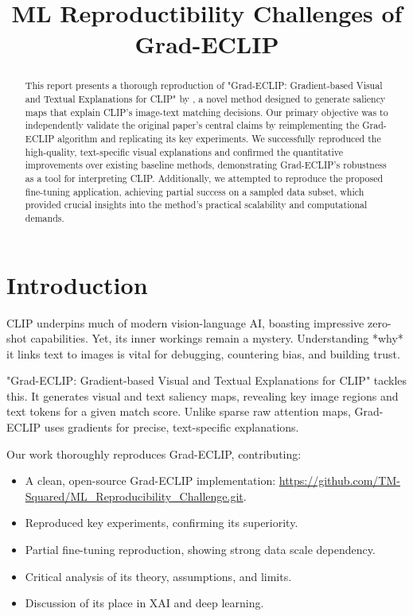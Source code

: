\documentclass[10pt]{article} %
\title{ML Reproductibility Challenges of  Grad-ECLIP}
\begin{document}
\maketitle

\begin{abstract}This report presents a thorough reproduction of "Grad-ECLIP: Gradient-based Visual and Textual Explanations for CLIP" by \citet{zhao2024grad}, a novel method designed to generate saliency maps that explain CLIP's image-text matching decisions. Our primary objective was to independently validate the original paper's central claims by reimplementing the Grad-ECLIP algorithm and replicating its key experiments. We successfully reproduced the high-quality, text-specific visual explanations and confirmed the quantitative improvements over existing baseline methods, demonstrating Grad-ECLIP's robustness as a tool for interpreting CLIP. Additionally, we attempted to reproduce the proposed fine-tuning application, achieving partial success on a sampled data subset, which provided crucial insights into the method's practical scalability and computational demands. 
\end{abstract}
\section{Introduction}

CLIP \citep{radford2021learning} underpins much of modern vision-language AI, boasting impressive zero-shot capabilities. Yet, its inner workings remain a mystery. Understanding *why* it links text to images is vital for debugging, countering bias, and building trust.

"Grad-ECLIP: Gradient-based Visual and Textual Explanations for CLIP" \citep{zhao2024grad} tackles this. It generates visual and text saliency maps, revealing key image regions and text tokens for a given match score. Unlike sparse raw attention maps, Grad-ECLIP uses gradients for precise, text-specific explanations.

Our work thoroughly reproduces Grad-ECLIP, contributing:
\begin{itemize}
    \item A clean, open-source Grad-ECLIP implementation: \url{https://github.com/TM-Squared/ML_Reproducibility_Challenge.git}.
    \item Reproduced key experiments, confirming its superiority.
    \item Partial fine-tuning reproduction, showing strong data scale dependency.
    \item Critical analysis of its theory, assumptions, and limits.
    \item Discussion of its place in XAI and deep learning.
\end{itemize}
\end{document}
